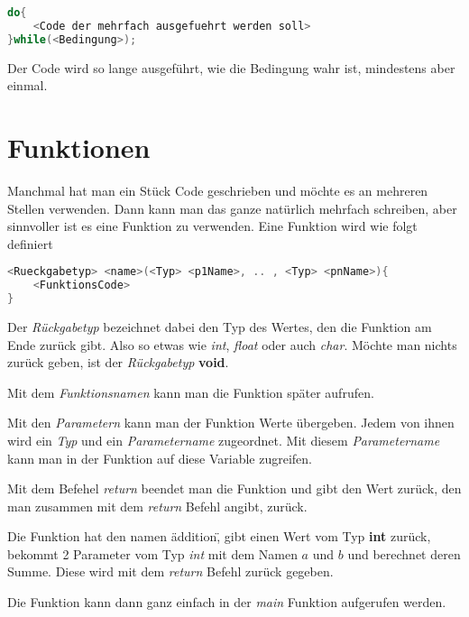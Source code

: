 \documentclass[c_worksheet.tex]{subfiles}
\begin{document}
\begin{lstlisting}[language=c]
do{
 	<Code der mehrfach ausgefuehrt werden soll>
}while(<Bedingung>);
\end{lstlisting} 

Der Code wird so lange ausgeführt, wie die Bedingung wahr ist, mindestens aber einmal.





\section{Funktionen}

Manchmal hat man ein Stück Code geschrieben und möchte es an mehreren Stellen verwenden. Dann kann man das ganze natürlich mehrfach schreiben, aber sinnvoller ist es eine Funktion zu verwenden. Eine Funktion wird wie folgt definiert

\begin{lstlisting}[language=c]
<Rueckgabetyp> <name>(<Typ> <p1Name>, .. , <Typ> <pnName>){
	<FunktionsCode>
}
\end{lstlisting}

Der \emph{Rückgabetyp} bezeichnet dabei den Typ des Wertes, den die Funktion am Ende zurück gibt. Also so etwas wie \emph{int}, \emph{float} oder auch \emph{char}. Möchte man nichts zurück geben, ist der \emph{Rückgabetyp} \textbf{void}.

Mit dem \emph{Funktionsnamen} kann man die Funktion später aufrufen.

Mit den \emph{Parametern} kann man der Funktion Werte übergeben. Jedem von ihnen wird ein \emph{Typ} und ein \emph{Parametername} zugeordnet. Mit diesem \emph{Parametername} kann man in der Funktion auf diese Variable zugreifen.

Mit dem Befehel \emph{return} beendet man die Funktion und gibt den Wert zurück, den man zusammen mit dem \emph{return} Befehl angibt, zurück.


 

Die Funktion hat den namen \"addition\", gibt einen Wert vom Typ \textbf{int} zurück, bekommt 2 Parameter vom Typ \emph{int} mit dem Namen \(a\) und \(b\) und berechnet deren Summe. Diese wird mit dem \emph{return} Befehl zurück gegeben.

Die Funktion kann dann ganz einfach in der \emph{main} Funktion aufgerufen werden.
\end{document}
